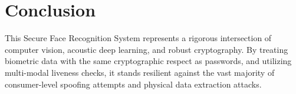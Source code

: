 \documentclass[12pt,a4paper]{article}
\begin{document}
\section{Conclusion}
This Secure Face Recognition System represents a rigorous intersection of computer vision, acoustic deep learning, and robust cryptography. By treating biometric data with the same cryptographic respect as passwords, and utilizing multi-modal liveness checks, it stands resilient against the vast majority of consumer-level spoofing attempts and physical data extraction attacks.
\end{document}
